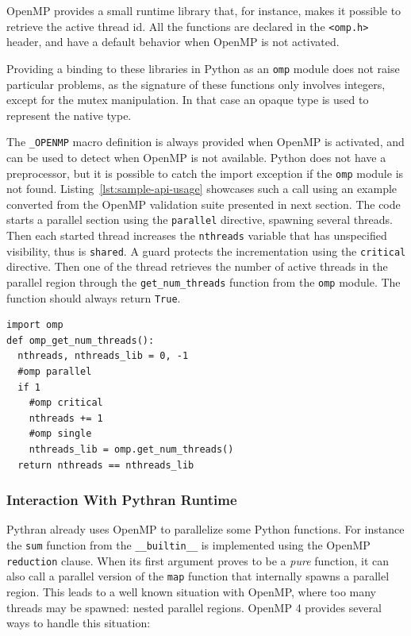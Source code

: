 \documentclass[conference]{IEEEtran}
\begin{document}
OpenMP provides a small runtime library that, for instance, makes it possible to
retrieve the active thread id. All the functions are declared in the
\texttt{<omp.h>} header, and have a default behavior when OpenMP is not
activated.

Providing a binding to these libraries in Python as an \texttt{omp} module does
not raise particular problems, as the signature of these functions only involves
integers, except for the mutex
manipulation. In that case an opaque type is used to represent the native type.

The \texttt{\_OPENMP} macro definition is always provided when OpenMP is
activated, and can be used to detect when OpenMP is not available. Python does
not have a preprocessor, but it is possible to catch the import exception if the
\texttt{omp} module is not found. Listing~\ref{lst:sample-api-usage} showcases
such a call using an example converted from the OpenMP validation suite
presented in next section. The code starts a parallel section using the
\texttt{parallel} directive, spawning several threads. Then each started thread
increases the \texttt{nthreads} variable that has unspecified visibility, thus
is \texttt{shared}. A guard protects the incrementation using the
\texttt{critical} directive. Then one of the thread retrieves the number of
active threads in the parallel region through the \texttt{get\_num\_threads}
function from the \texttt{omp} module. The function should always return
\texttt{True}.

\begin{lstlisting}[float,label={lst:sample-api-usage},caption={Example of
        OpenMP API usage from Python.}]
import omp
def omp_get_num_threads():
  nthreads, nthreads_lib = 0, -1
  #omp parallel
  if 1
    #omp critical
    nthreads += 1
    #omp single
    nthreads_lib = omp.get_num_threads()
  return nthreads == nthreads_lib
\end{lstlisting}

\subsubsection{Interaction With Pythran Runtime}

Pythran already uses OpenMP to parallelize some Python functions. For instance
the \texttt{sum} function from the \texttt{\_\_builtin\_\_} is implemented using
the OpenMP \texttt{reduction} clause. When its first argument proves to be a
\emph{pure} function, it can also call a parallel version of the
\texttt{map} function that internally spawns a parallel region. This leads to a
well known situation with OpenMP, where too many threads may be spawned: nested
parallel regions. OpenMP 4 provides several ways to handle this situation:
\end{document}

